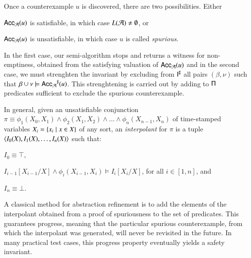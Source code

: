 \documentclass{llncs}
\begin{document}
Once a counterexample $u$ is discovered, there are two
possibilities. Either\begin{inparaenum}[(i)]
\item $\mathsf{Acc}_{\mathcal{A}}(u)$ is satisfiable, in which case $L(\mathcal{A}) \neq \emptyset$, or
\item $\mathsf{Acc}_{\mathcal{A}}(u)$ is unsatisfiable, in which case $u$ is called
  \emph{spurious}.
\end{inparaenum}
In the first case, our semi-algorithm stops and returns a witness for
non-emptiness, obtained from the satisfying valuation of
$\mathsf{Acc}_{\mathcal{A}}(u)$ and in the second case, we must strenghten the
invariant by excluding from ${\mathsf{I}}^\sharp$ all pairs $(\beta,\nu)$ such
that $\beta\cup\nu \models {\mathsf{Acc}_{\mathcal{A}}}^\sharp(u)$. This strenghtening
is carried out by adding to $\mathsf{\Pi}$ predicates sufficient to exclude
the spurious counterexample.

In general, given an unsatisfiable conjunction $\pi \equiv
\phi_1(X_0,X_1) \wedge \phi_2(X_1,X_2) \wedge \ldots \wedge
\phi_n(X_{n-1},X_n)$ of time-stamped variables $X_i = \left\{ x_i \mid x
  \in X \right\}$ of any sort, an \emph{interpolant} for $\pi$ is a tuple
$\left\langle I_0(X), I_1(X), \ldots, I_n(X) \right\rangle$ such
that:\begin{inparaenum}[(i)]
\item $I_0 \equiv \top$,  
%
\item $I_{i-1}[X_{i-1}/X] \wedge \phi_i(X_{i-1},X_i) \models
  I_i[X_i/X]$, for all $i \in [1,n]$, and
%
\item $I_n \equiv \bot$. 
\end{inparaenum}
A classical method for abstraction refinement is to add the elements
of the interpolant obtained from a proof of spuriousness to the set of
predicates. This guarantees progress, meaning that the particular
spurious counterexample, from which the interpolant was generated,
will never be revisited in the future. In many practical test cases,
this progress property eventually yields a safety invariant. 

 

\end{document}
